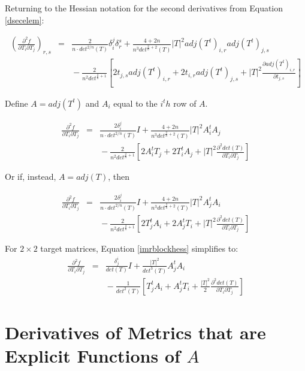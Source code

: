 \documentclass{report}
\begin{document}
\noindent Returning to the Hessian notation for the second derivatives from Equation \ref{dsecelem}:


\begin{eqnarray}
\left(\frac{\partial^2 f}{\partial T_i \partial T_j}\right)_{r,s} &=&
\frac{2}{n \cdot det^{2/n}(T)} \delta_i^j \delta_r^s
     + \frac{4 + 2n}{n^3 det^{\frac{2}{n}+2}(T)} |T|^2 adj(T^t)_{i,r} adj(T^t)_{j,s} \\
\nonumber
& & {} - \frac{2}{n^2 det^{\frac{2}{n}+1}} \left[ 
     2 t_{j,s} adj(T^t)_{i,r} + 2 t_{i,r} adj(T^t)_{j,s}
     + |T|^2 \frac{\partial adj(T^t)_{i,r}}{\partial t_{j,s}} \right] 
\end{eqnarray}

\noindent Define $A = adj(T^t)$ and $A_i$ equal to the $i^th$ row of $A$.

\begin{eqnarray}
\frac{\partial^2 f}{\partial T_i \partial T_j}
&=& \frac{2 \delta_i^j}{n \cdot det^{2/n}(T)} I
+ \frac{4 + 2n}{n^3 det^{\frac{2}{n}+2}(T)} |T|^2 A_i^t A_j \\ \nonumber
& & {} - \frac{2}{n^2 det^{\frac{2}{n}+1}} \left[ 
2 A_i^t T_j + 2 T_i^t A_j + |T|^2 \frac{\partial^2 det(T)}{\partial T_i \partial T_j} \right]
\end{eqnarray}

\noindent Or if, instead, $A = adj(T)$, then

\begin{eqnarray} \label{imrblockhess}
\frac{\partial^2 f}{\partial T_i \partial T_j} 
&=& \frac{2 \delta_i^j}{n \cdot det^{2/n}(T)} I
+ \frac{4 + 2n}{n^3 det^{\frac{2}{n}+2}(T)} |T|^2 A_j^t A_i \\ \nonumber
& & {} - \frac{2}{n^2 det^{\frac{2}{n}+1}} \left[ 
2 T_j^t A_i + 2 A_j^t T_i + |T|^2 \frac{\partial^2 det(T)}{\partial T_i \partial T_j} \right]
\end{eqnarray}



\noindent For $2 \times 2$ target matrices, Equation \ref{imrblockhess} simplifies to:
\begin{eqnarray}
\frac{\partial^2 f}{\partial T_i \partial T_j}
&=& \frac{\delta^i_j}{det(T)}I + \frac{|T|^2}{det^3(T)} A_j^t A_i \\ \nonumber
& & {} - \frac{1}{det^2(T)} \left[ T_j^t A_i + A_j^t T_i 
+ \frac{|T|^2}{2} \frac{\partial^2 det(T)}{\partial T_i \partial T_j} \right]
\end{eqnarray}


\chapter{Derivatives of Metrics that are Explicit Functions of $A$}
\end{document}
